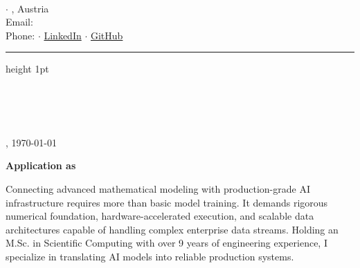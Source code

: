 \documentclass[11pt,a4paper]{article}
\begin{document}
\begin{minipage}[t]{0.55\textwidth}
    {\Large \bfseries \color{primary} \meinName}\\[0.2em]
    {\small \color{accent} \bfseries \stellenTitel}
\end{minipage}
\begin{minipage}[t]{0.45\textwidth}
    \raggedleft \footnotesize \color{textgray}
    \meineStrasse $\cdot$ \meinOrt, Austria\\
    Email: \href{mailto:\meineEmail}{\meineEmail}\\
    Phone: \meineTel $\cdot$ \href{\meinLinkedin}{LinkedIn} $\cdot$ \href{\meinGithub}{GitHub}
\end{minipage}

\vspace{0.8em}
\color{accent}\hrule height 1pt
\vspace{1.0em}

\begin{minipage}[t]{0.55\textwidth}
    \color{primary} \small
    \textbf{\firmenName}\\[0.15em]
    \ansprechPartner\\[0.15em]
    \firmenAdresse\\[0.15em]
\end{minipage}
\begin{minipage}[t]{0.45\textwidth}
    \raggedleft \small \color{textgray}
    \meinOrt, \today
\end{minipage}

\vspace{1.2em}

\vspace{0.8cm}
{\Large\bfseries\color{primary} Application as \stellenTitel}


\vspace{0.6em}

\color{primary} \small

\anrede

Connecting advanced mathematical modeling with production-grade AI infrastructure requires more than basic model training. It demands rigorous numerical foundation, hardware-accelerated execution, and scalable data architectures capable of handling complex enterprise data streams. Holding an M.Sc. in Scientific Computing with over 9 years of engineering experience, I specialize in translating AI models into reliable production systems.
\end{document}
